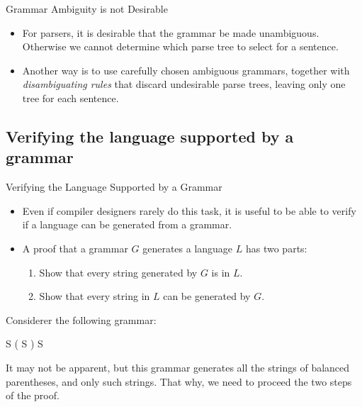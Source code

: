 \begin{bibunit}[apalike]
\begin{frame}{Grammar Ambiguity is not Desirable}
	\begin{itemize}
	\item For parsers, it is desirable that the grammar be made unambiguous. Otherwise we cannot determine which parse tree to select for a sentence.
	\vfill
	\item Another way is to use carefully chosen ambiguous grammars, together with \emph{disambiguating rules} that discard undesirable parse trees, leaving only one tree for each sentence.
	\end{itemize}
\end{frame}

\subsection{Verifying the language supported by a grammar}

\tableofcontentslide[sections={1-4},sectionstyle={show/shaded},subsectionstyle={show/shaded/hide},subsubsectionstyle={show/show/hide/hide}]

\begin{frame}{Verifying the Language Supported by a Grammar}
	\begin{small}
	\begin{itemize}
	\item Even if compiler designers rarely do this task, it is useful to be able to verify if a language can be generated from a grammar.
	\vfill
	\item A proof that a grammar $G$ generates a language $L$ has two parts:
		\begin{enumerate}
		\item Show that every string generated by $G$ is in $L$.
		\item Show that every string in $L$ can be generated by $G$.
		\end{enumerate}
	\end{itemize}
	\begin{example}
		Considerer the following grammar:
		\begin{center}\bnfstyle S \bnfbody \tok( S \tok) S \bnfor {}\end{center}
		It may not be apparent, but this grammar generates all the strings of balanced parentheses, and only such strings.  That why, we need to proceed the two steps of the proof.
	\end{example}
	\end{small}
\end{frame}


\end{bibunit}
